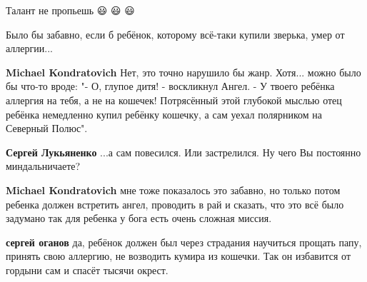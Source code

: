 \begin{itemize}
Талант не пропьешь 😃 😃 😃

 
Было бы забавно, если б ребёнок, которому всё-таки купили зверька, умер от аллергии...

\begin{itemize}
 
\textbf{Michael Kondratovich} Нет, это точно нарушило бы жанр. Хотя... можно было бы что-то вроде: "- О, глупое дитя! - воскликнул Ангел. - У твоего ребёнка аллергия на тебя, а не на кошечек! Потрясённый этой глубокой мыслью отец ребёнка немедленно купил ребёнку кошечку, а сам уехал полярником на Северный Полюс".

 
\textbf{Сергей Лукьяненко} ...а сам повесился. Или застрелился. Ну чего Вы постоянно миндальничаете? 🤣🤣🤣

 
\textbf{Michael Kondratovich} мне тоже показалось это забавно, но только потом ребенка должен встретить ангел, проводить в рай и сказать, что это всё было задумано так для ребенка у бога есть очень сложная миссия.

 
\textbf{сергей оганов} да, ребёнок должен был через страдания научиться прощать папу, принять свою аллергию, не возводить кумира из кошечки. Так он избавится от гордыни сам и спасёт тысячи окрест.


\end{itemize}
\end{itemize}
